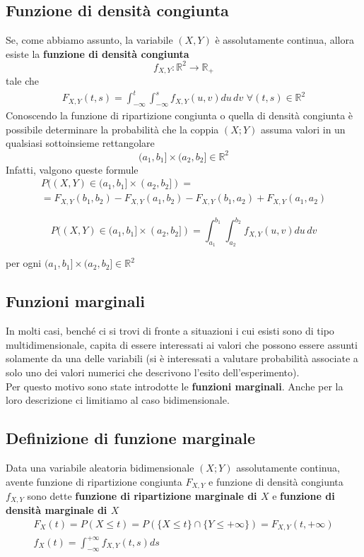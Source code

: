 \subsection{Funzione di densità congiunta}
Se, come abbiamo assunto, la variabile $(X, Y)$ è assolutamente continua, allora esiste la \textbf{funzione di densità congiunta}
\begin{equation}
f_{X, Y}: \mathbb{R}^2 \rightarrow \mathbb{R}_+
\end{equation}
tale che 
\begin{align}
	F_{X, Y}(t,s) = \int_{-\infty}^{t} \int_{-\infty}^{s} f_{X,Y}(u, v) du \, dv \, \, \forall (t,s) \in \mathbb{R}^2
\end{align}
Conoscendo la funzione di ripartizione congiunta o quella di densità congiunta è possibile determinare la probabilità che la coppia  $(X ;Y)$   assuma valori in un qualsiasi sottoinsieme rettangolare
\[
(a_1, b_1] \times (a_2, b_2] \in \mathbb{R}^2
\]
Infatti, valgono queste formule
\begin{multline}
	P((X,Y) \in (a_1, b_1] \times (a_2, b_2]) = \\
	= F_{X,Y}(b_1, b_2) - F_{X,Y}(a_1, b_2) - F_{X,Y}(b_1, a_2) + F_{X,Y}(a_1, a_2)
\end{multline}

\begin{equation}
	P((X,Y) \in (a_1, b_1] \times (a_2, b_2]) = \int_{a_1}^{b_1} \int_{a_2}^{b_2} f_{X,Y} (u,v)du \, dv
\end{equation}

per ogni $(a_1, b_1] \times (a_2, b_2] \in \mathbb{R}^2$

\subsection{Funzioni marginali}
In molti casi, benché ci si trovi di fronte a situazioni i cui esisti sono di tipo multidimensionale, capita di essere interessati ai valori che possono essere assunti solamente da una delle variabili (si è interessati a valutare probabilità associate a solo uno dei valori numerici che descrivono l'esito dell'esperimento).\\
Per questo motivo sono state introdotte le \textbf{funzioni marginali}. Anche per la loro descrizione ci limitiamo al caso bidimensionale.\\

\subsection{Definizione di funzione marginale}
Data una variabile aleatoria bidimensionale $(X; Y)$ assolutamente continua, avente funzione di ripartizione congiunta $F_{X, Y}$ e funzione di densità congiunta $f_{X, Y}$ sono dette \textbf{funzione di ripartizione marginale di $X$} e \textbf{funzione di densità marginale di $X$}
\begin{gather}
	F_X(t) = P(X \leq t) = P(\{X \leq t\} \cap \{Y \leq + \infty\}) = F_{X, Y} (t, +\infty) \\
	f_X(t) = \int_{-\infty}^{+\infty} f_{X, Y} (t, s) ds
\end{gather}

